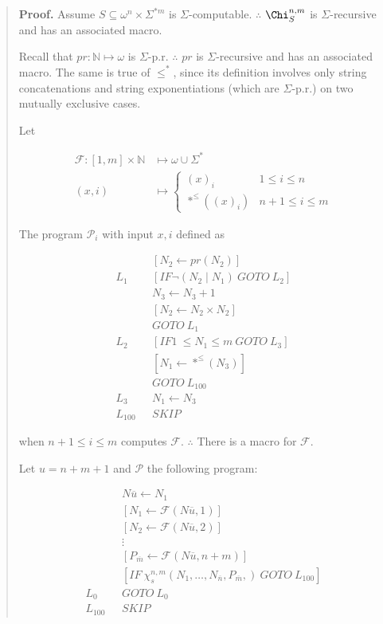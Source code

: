 \documentclass[a4paper, 12pt]{article}
\begin{document}
\small
\begin{quote}

\textbf{Proof.} Assume $S \subseteq \omega^{n} \times \Sigma^{*m} $ is
$\Sigma$-computable. $\therefore $ $\Chi_{S}^{n, m}$ is $\Sigma$-recursive and
has an associated macro.

Recall that $pr : \mathbb{N} \mapsto \omega$ is
$\Sigma$-p.r. $\therefore $ $pr$ is $\Sigma$-recursive and has an associated
macro. The same is true of $\leq^{*}$, since its definition involves only string
concatenations and string exponentiations (which are $\Sigma$-p.r.) on two
mutually exclusive cases. 

Let

\begin{align*}
    \mathcal{F} : [1, m]  \times \mathbb{N} &\mapsto \omega \cup \Sigma^{*}  \\ 
    (x, i) &\mapsto \begin{cases}
        (x)_i & 1 \leq i \leq n \\
        *^{\leq} \left( (x)_i \right) & n + 1 \leq i \leq m
    \end{cases}
\end{align*}

The program $\mathcal{P}_i$ with input $x, i$ defined as

\begin{align*}
   &[N_2 \leftarrow pr(N_2)] \\
    L_1 ~ ~ ~ &[IF \neg (N_2 \mid N_1) ~ GOTO ~ L_2] \\
              & N_3 \leftarrow N_3 + 1 \\ 
              & [N_2 \leftarrow N_2 \times N_2] \\ 
              & GOTO ~ L_1 \\ 
    L_2 ~ ~ ~ & [IF 1~ \leq N_1 \leq m ~ GOTO ~ L_{3}]\\
    & [N_1 \leftarrow *^{\leq}(N_3)] \\ 
              &GOTO ~ L_{100} \\
    L_3 ~ ~ ~ & N_1 \leftarrow N_3 \\ 
    L_{100} ~ ~ ~ & SKIP
\end{align*}

when $n + 1 \leq i \leq m$ computes $\mathcal{F}$. $\therefore $ There is a
macro for $\mathcal{F}$.

Let $u = n + m + 1$ and $\mathcal{P}$ the following program:

\begin{align*}
    &N \overline{u} \leftarrow N_1\\
    &[N_1 \leftarrow \mathcal{F}(N \overline{u}, 1)] \\
    &[N_2 \leftarrow \mathcal{F}(N \overline{u}, 2)] \\ 
    &\vdots \\
    &[P_{\overline{m}} \leftarrow \mathcal{F}(N \overline{u}, n+m)] \\
    &[IF ~ \chi_s^{n, m} \left( N_1, \ldots, N_{\overline{n}}, P_{\overline{m}},
    \right) ~ GOTO ~ L_{100}] \\
    L_{0} ~ ~ ~ & GOTO ~ L_0 \\ 
    L_{100} ~ ~ ~ & SKIP
\end{align*}


\end{quote}
\end{document}
